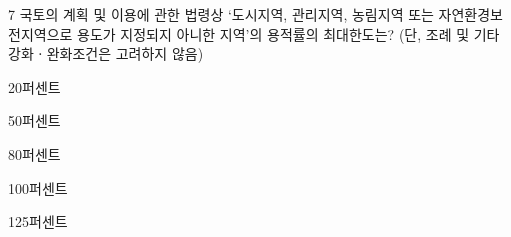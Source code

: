 \begin{question}{7}
국토의 계획 및 이용에 관한 법령상 ‘도시지역, 관리지역, 농림지역 또는 자연환경보전지역으로 용도가 지정되지 아니한 지역’의 용적률의 최대한도는? (단, 조례 및 기타 강화ㆍ완화조건은 고려하지 않음)
\begin{choices}
  \item 20퍼센트
  \item 50퍼센트
  \item 80퍼센트
  \item 100퍼센트
  \item 125퍼센트
\end{choices}
\end{question}
